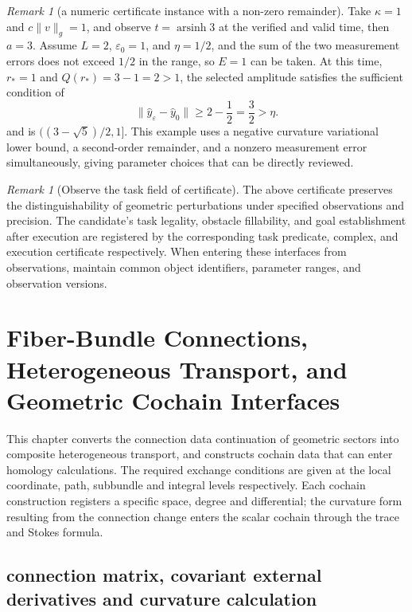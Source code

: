 \documentclass[12pt,a4paper,openany,notitlepage]{report}
\theoremstyle{plain}
\theoremstyle{definition}
\theoremstyle{remark}
\newtheorem{remark}[theorem]{Remark}
\begin{document}
\begin{CJK*}
\begin{remark}
[a numeric certificate instance with a non-zero remainder]Take $\kappa=1$ and $c\lVert v\rVert_g=1$, and observe $t=\operatorname{arsinh}3$ at the verified and valid time, then $a=3$. Assume $L=2$, $\varepsilon_0=1$, and $\eta=1/2$, and the sum of the two measurement errors does not exceed $1/2$ in the range, so $E=1$ can be taken. At this time, $r_*=1$ and $Q(r_*)=3-1=2>1$, the selected amplitude satisfies the sufficient condition of \[
\lVert\widehat y_\varepsilon-\widehat y_0\rVert
\ge2-\frac12=\frac32>\eta.
\] and is $((3-\sqrt5)/2,1]$. This example uses a negative curvature variational lower bound, a second-order remainder, and a nonzero measurement error simultaneously, giving parameter choices that can be directly reviewed.\end{remark}


\begin{remark}
[Observe the task field of certificate]The above certificate preserves the distinguishability of geometric perturbations under specified observations and precision. The candidate's task legality, obstacle fillability, and goal establishment after execution are registered by the corresponding task predicate, complex, and execution certificate respectively. When entering these interfaces from observations, maintain common object identifiers, parameter ranges, and observation versions.\end{remark}


\chapter{Fiber-Bundle Connections, Heterogeneous Transport, and Geometric Cochain Interfaces}
\label{exp:ch:transport}


This chapter converts the connection data continuation of geometric sectors into composite heterogeneous transport, and constructs cochain data that can enter homology calculations. The required exchange conditions are given at the local coordinate, path, subbundle and integral levels respectively. Each cochain construction registers a specific space, degree and differential; the curvature form resulting from the connection change enters the scalar cochain through the trace and Stokes formula.

\section { connection matrix, covariant external derivatives and curvature calculation }\label{hgov:geo:transport}



\end{CJK*}
\end{document}
